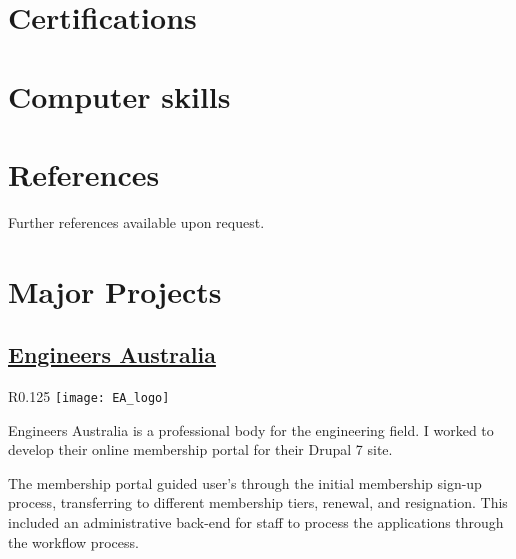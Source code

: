 \documentclass[11pt,a4paper,sans]{moderncv}        %
\begin{document}
\section{Certifications}

\section{Computer skills}

\section{References}
  Further references available upon request.

\clearpage
\section{Major Projects}
  \subsection{\href{https://www.engineersaustralia.org.au/}{Engineers Australia}}
    \begin{wrapfigure}{R}{0.125\textwidth}
      \vspace{-10pt}
      \texttt{[image: EA\_logo]}
      \vspace{-20pt}
    \end{wrapfigure}
    Engineers Australia is a professional body for the engineering field. I worked to develop their online membership portal for their Drupal 7 site.

    The membership portal guided user's through the initial membership sign-up process, transferring to different membership tiers, renewal, and resignation. This included an administrative back-end for staff to process the applications through the workflow process.
\end{document}
